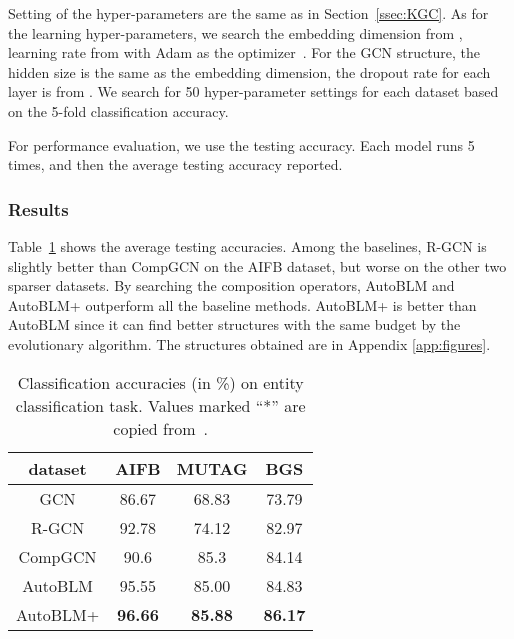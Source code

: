\documentclass[10pt,journal,compsoc]{IEEEtran}
\begin{document}
Setting of the hyper-parameters  are the same as in
Section~\ref{ssec:KGC}.
As for the learning hyper-parameters,
we search the embedding dimension  
from , 
learning rate from  with Adam as the optimizer~\cite{kingma2014adam}.
For the GCN structure,
the hidden size is the same as the embedding dimension,
the dropout rate 
for each layer is from .
We search for 50 hyper-parameter settings
for each dataset based on the 5-fold classification accuracy.


For performance evaluation, we use 
the testing accuracy.
Each model runs 5 times, and then the average testing accuracy reported.



\subsubsection{Results}

Table~\ref{tab:classification}
shows the average testing accuracies.
Among the baselines, R-GCN is slightly better than CompGCN on the AIFB dataset,
but worse on the other two sparser datasets.
By searching the composition operators,
AutoBLM and AutoBLM+  outperform all the baseline methods.
AutoBLM+ is better than AutoBLM 
since it can find better structures 
with the same budget 
by the evolutionary algorithm.
The structures obtained are in Appendix \ref{app:figures}.


\begin{table}[ht]
	\centering
	\vspace{-5px}
	\caption{Classification accuracies (in \%) on entity classification task. Values marked ``*'' are copied from~\cite{vashishth2019composition}.}
	\label{tab:classification}
	\vspace{-10px}
	\begin{tabular}{c|ccc}
		\toprule
		 dataset   &        AIFB         &        MUTAG        &         BGS         \\ \midrule
 GCN     &   86.67    &   68.83     &   73.79     \\
R-GCN    &   92.78      &   74.12    &   82.97    \\
CompGCN   &  90.6   &  85.3   &   84.14    \\
AutoBLM  &   95.55 	&   85.00   &  84.83   \\
AutoBLM+ & \bf{96.66} & \bf{85.88} & \bf{86.17} \\ \bottomrule
	\end{tabular}
\vspace{-12px}
\end{table}
\end{document}
